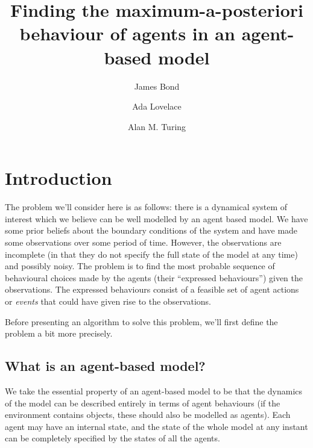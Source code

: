 \documentclass[sigconf]{aamas}
\title[Finding the MAP behaviour in an ABM]{Finding the maximum-a-posteriori behaviour of agents in an agent-based model}
\author{James Bond}
\affiliation{
  \institution{Secret Intelligence Service}
  \city{Vauxhall, London}}
\author{Ada Lovelace}
\affiliation{
  \institution{Analytical Engines, Inc.}
  \city{Ockham Park}
  \state{Surrey}}
\author{Alan M. Turing}
\affiliation{
  \department{Computing Machine Laboratory}
  \institution{Victoria University of Manchester}}
\begin{document}

\pagestyle{fancy}
\fancyhead{}


\maketitle 



\section{Introduction}

The problem we'll consider here is as follows: there is a dynamical system of interest which we believe can be well modelled by an agent based model. We have some prior beliefs about the boundary conditions of the system and have made some observations over some period of time. However, the observations are incomplete (in that they do not specify the full state of the model at any time) and possibly noisy. The problem is to find the most probable sequence of behavioural choices made by the agents (their ``expressed behaviours'') given the observations. The expressed behaviours consist of a feasible set of agent actions or \textit{events} that could have given rise to the observations.

Before presenting an algorithm to solve this problem, we'll first define the problem a bit more precisely.

\subsection{What is an agent-based model?}

We take the essential property of an agent-based model to be that the dynamics of the model can be described entirely in terms of agent behaviours (if the environment contains objects, these should also be modelled as agents). Each agent may have an internal state, and the state of the whole model at any instant can be completely specified by the states of all the agents.
\end{document}
